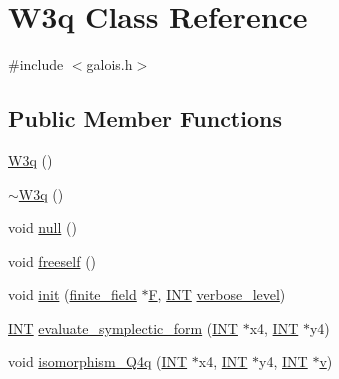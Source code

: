 \hypertarget{class_w3q}{}\section{W3q Class Reference}
\label{class_w3q}


{\ttfamily \#include $<$galois.\+h$>$}

\subsection*{Public Member Functions}
\begin{DoxyCompactItemize}
\item 
\mbox{\hyperlink{class_w3q_a768356f42fe34c262de0e25c32674aba}{W3q}} ()
\item 
\mbox{\hyperlink{class_w3q_a102f1c2912d727fe5251530c905afa38}{$\sim$\+W3q}} ()
\item 
void \mbox{\hyperlink{class_w3q_a44efdd4625aa1a1c8f4e56a98aca8e3f}{null}} ()
\item 
void \mbox{\hyperlink{class_w3q_a66437e3cf668d4de4a6661f444fd3d77}{freeself}} ()
\item 
void \mbox{\hyperlink{class_w3q_a215fe070895a4915537fcb1bfba4f777}{init}} (\mbox{\hyperlink{classfinite__field}{finite\+\_\+field}} $\ast$\mbox{\hyperlink{class_w3q_a3989d8ebb5363eae87a4710bbdee3595}{F}}, \mbox{\hyperlink{galois_8h_a09fddde158a3a20bd2dcadb609de11dc}{I\+NT}} \mbox{\hyperlink{simeon_8_c_a818073fbcc2f439e7c56952f67386122}{verbose\+\_\+level}})
\item 
\mbox{\hyperlink{galois_8h_a09fddde158a3a20bd2dcadb609de11dc}{I\+NT}} \mbox{\hyperlink{class_w3q_a73ac833e6a6177af4f4b870627ae48ee}{evaluate\+\_\+symplectic\+\_\+form}} (\mbox{\hyperlink{galois_8h_a09fddde158a3a20bd2dcadb609de11dc}{I\+NT}} $\ast$x4, \mbox{\hyperlink{galois_8h_a09fddde158a3a20bd2dcadb609de11dc}{I\+NT}} $\ast$y4)
\item 
void \mbox{\hyperlink{class_w3q_a734ed96f8ddfcfcae3445df129951bae}{isomorphism\+\_\+\+Q4q}} (\mbox{\hyperlink{galois_8h_a09fddde158a3a20bd2dcadb609de11dc}{I\+NT}} $\ast$x4, \mbox{\hyperlink{galois_8h_a09fddde158a3a20bd2dcadb609de11dc}{I\+NT}} $\ast$y4, \mbox{\hyperlink{galois_8h_a09fddde158a3a20bd2dcadb609de11dc}{I\+NT}} $\ast$\mbox{\hyperlink{simeon_8_c_aeb3f3030944801b163bc3b829a7f6710}{v}})
\end{DoxyCompactItemize}
